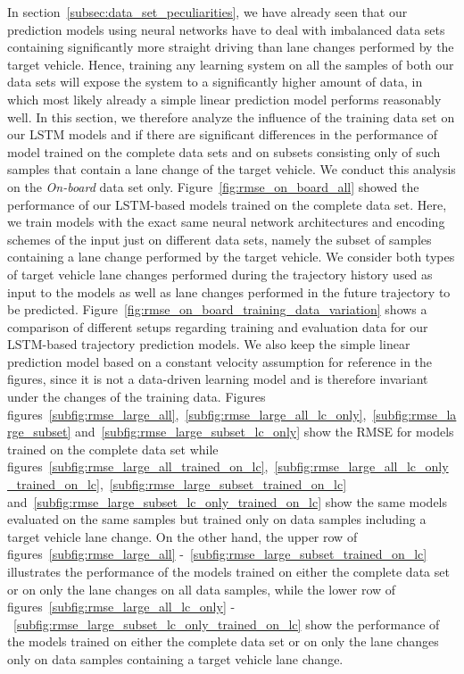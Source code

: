 In section~\ref{subsec:data_set_peculiarities}, we have already seen that our prediction models using neural networks have to deal with imbalanced data sets containing significantly more straight driving than lane changes performed by the target vehicle.
Hence, training any learning system on all the samples of both our data sets will expose the system to a significantly higher amount of data, in which most likely already a simple linear prediction model performs reasonably well. 
In this section, we therefore analyze the influence of the training data set on our \ac{LSTM} models and if there are significant differences in the performance of model trained on the complete data sets and on subsets consisting only of such samples that contain a lane change of the target vehicle.
We conduct this analysis on the \emph{On-board} data set only.
Figure~\ref{fig:rmse_on_board_all} showed the performance of our \ac{LSTM}-based models trained on the complete data set.
Here, we train models with the exact same neural network architectures and encoding schemes of the input just on different data sets, namely the subset of samples containing a lane change performed by the target vehicle.
We consider both types of target vehicle lane changes performed during the trajectory history used as input to the models as well as lane changes performed in the future trajectory to be predicted.
Figure~\ref{fig:rmse_on_board_training_data_variation} shows a comparison of different setups regarding training and evaluation data for our \ac{LSTM}-based trajectory prediction models.
We also keep the simple linear prediction model based on a constant velocity assumption for reference in the figures, since it is not a data-driven learning model and is therefore invariant under the changes of the training data.
Figures figures~\ref{subfig:rmse_large_all},~\ref{subfig:rmse_large_all_lc_only},~\ref{subfig:rmse_large_subset} and~\ref{subfig:rmse_large_subset_lc_only} show the \ac{RMSE} for models trained on the complete data set while figures~\ref{subfig:rmse_large_all_trained_on_lc},~\ref{subfig:rmse_large_all_lc_only_trained_on_lc},~\ref{subfig:rmse_large_subset_trained_on_lc} and~\ref{subfig:rmse_large_subset_lc_only_trained_on_lc} show the same models evaluated on the same samples but trained
only on data samples including a target vehicle lane change.
On the other hand, the upper row of figures~\ref{subfig:rmse_large_all} -~\ref{subfig:rmse_large_subset_trained_on_lc} illustrates the performance of the models trained on either the complete data set or on only the lane changes on all data samples, while the lower row of figures~\ref{subfig:rmse_large_all_lc_only} -~\ref{subfig:rmse_large_subset_lc_only_trained_on_lc} show the performance of the models trained on either the complete data set or on only the lane changes only on data samples containing a target vehicle lane change.

